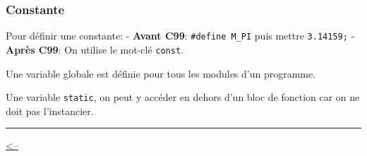 \subsubsection{Constante}\label{constante}

Pour définir une constante: - \textbf{Avant C99}:
\texttt{\#define\ M\_PI} puis mettre \texttt{3.14159;} - \textbf{Après
C99}: On utilise le mot-clé \texttt{const}.

Une variable globale est définie pour tous les modules d'un programme.

Une variable \texttt{static}, on peut y accéder en dehors d'un bloc de
fonction car on ne doit pas l'instancier.

\begin{center}\rule{0.5\linewidth}{0.5pt}\end{center}

\href{../README.md}{\textless--}
